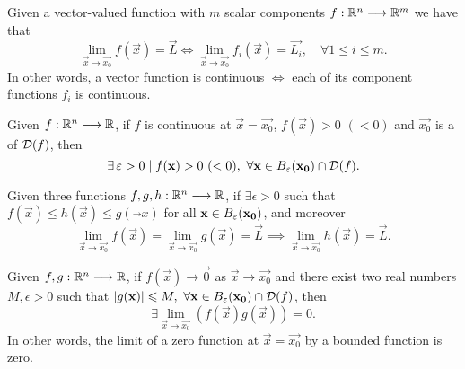 \begin{prop}
    Given a vector-valued function with $m$ scalar components $\appl{f}{\Rtn}{\R^m}$ we have that
    \begin{equation}
        \lim_{\vec{x}\to\vec{x_0}}f(\vec{x}) = \vec{L}\iff\lim_{\vec{x}\to\vec{x_0}} f_i(\vec{x}) = \vec{L_i},\quad\forall
            1 \leq i \leq m.
    \end{equation}
    In other words, a vector function is continuous $\iff$ each of its component functions $f_i$ is continuous.
\end{prop}

\begin{prop}
    Given $\appl{f}{\Rtn}{\R}$, if $f$ is continuous at $\vec{x} = \vec{x_0}$, $f(\vec{x}) > 0$ $(< 0)$ and $\vec{x_0}$ is
    a  of $\dom{f}$, then
    \begin{equation}
        \exists\epsilon > 0\st f(\vec{x}) > 0\ (< 0),\ \forall\vec{x}\in\oball{\epsilon}{\vec{x_0}}\cap\dom{f}.
    \end{equation}
\end{prop}

\begin{lemma}
    Given three functions $\appl{f, g, h}{\Rtn}{\R}$, if $\exists\epsilon > 0$ such that $f(\vec{x})\leq h(\vec{x})\leq 
    g(\vec{}x)$ for all $\vec{x}\in\oball{\epsilon}{\vec{x_0}}$, and moreover 
    \begin{equation}
        \lim_{\vec{x}\to\vec{x_0}}f(\vec{x}) = \lim_{\vec{x}\to\vec{x_0}}g(\vec{x}) = \vec{L}\implies
        \lim_{\vec{x}\to\vec{x_0}}h(\vec{x}) = \vec{L}. 
    \end{equation}
\end{lemma}

\begin{prop}
    Given $\appl{f, g}{\Rtn}{\R}$, if $f(\vec{x})\longrightarrow\vec{0}$ as $\vec{x}\longrightarrow\vec{x_0}$ and there
    exist two real numbers $M, \epsilon > 0$ such that $\abs{g(\vec{x})}\leq M,\ \forall\vec{x}\in
    \oball{\epsilon}{\vec{x_0}}\cap\dom{f}$, then
    \begin{equation}
        \exists\lim_{\vec{x}\to\vec{x_0}}\left(f(\vec{x})g(\vec{x})\right) = 0.
    \end{equation}
    In other words, the limit of a zero function at $\vec{x} = \vec{x_0}$ by a bounded function is zero.
\end{prop}

